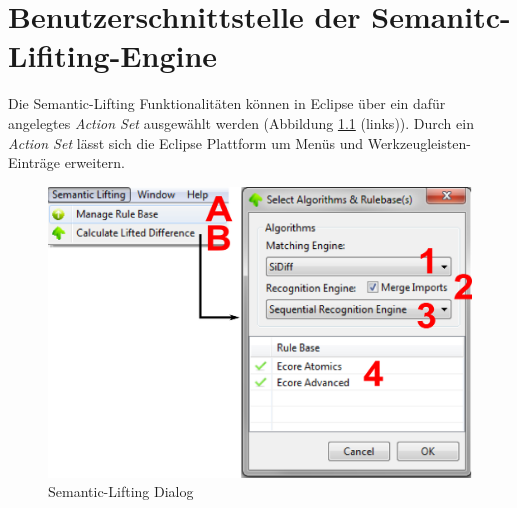 \chapter{Benutzerschnittstelle der Semanitc-Lifiting-Engine}
\label{benutzer}

Die Semantic-Lifting Funktionalitäten können in Eclipse über ein dafür angelegtes \textit{Action
Set} ausgewählt werden (Abbildung \ref{fig:semantic_lifting_dialog} (links)). Durch ein \textit{Action
Set} lässt sich die Eclipse Plattform um Menüs und Werkzeugleisten-Einträge erweitern. 

\begin{figure}[htb]
  \centering
  \includegraphics[scale=0.8]{images/semantic_lifting_dialog.png}
  \caption{Semantic-Lifting Dialog}
  \label{fig:semantic_lifting_dialog}
\end{figure}

